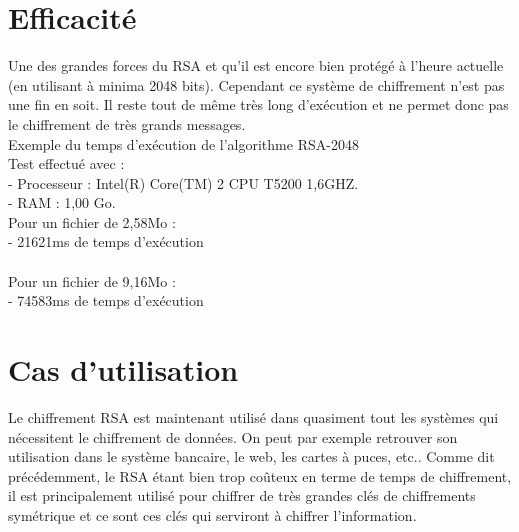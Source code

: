 		
	\section{Efficacité}
		Une des grandes forces du RSA et qu'il est encore bien protégé à l'heure actuelle (en utilisant à minima 2048 bits). Cependant ce système de chiffrement n'est pas une fin en soit. Il reste tout de même très long d'exécution et ne permet donc pas le chiffrement de très grands messages.\\
		
		Exemple du temps d'exécution de l'algorithme RSA-2048\\
			Test effectué avec :\\
			- Processeur : Intel(R) Core(TM) 2 CPU T5200 1,6GHZ.\\
			- RAM : 1,00 Go.\\
			
			Pour un fichier de 2,58Mo :\\
				- 21621ms de temps d'exécution\\\\ 
			Pour un fichier de 9,16Mo :\\
				- 74583ms de temps d'exécution\\
				
		
	\section{Cas d'utilisation}
		Le chiffrement RSA est maintenant utilisé dans quasiment tout les systèmes qui nécessitent le chiffrement de données. On peut par exemple retrouver son utilisation dans le système bancaire, le web, les cartes à puces, etc..
		Comme dit précédemment, le RSA étant bien trop coûteux en terme de temps de chiffrement, il est principalement utilisé pour chiffrer de très grandes clés de chiffrements symétrique et ce sont ces clés qui serviront à chiffrer l'information.